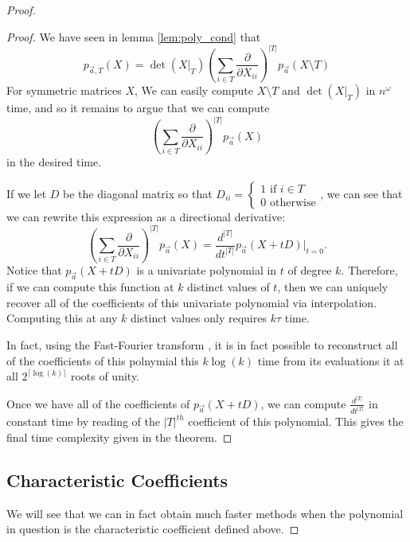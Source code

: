 \begin{proof}
\begin{proof}
    We have seen in lemma \ref{lem:poly_cond} that
    \[
        p_{\vec{a}, T}(X) = \det(X|_T) \left( \sum_{i \in T} \frac{\partial}{\partial X_{ii}} \right)^{|T|}p_{\vec{a}}(X \setminus T) 
    \]
    For symmetric matrices $X$, We can easily compute $X \setminus T$ and $\det(X|_T)$ in $n^{\omega}$ time, and so it remains to argue that we can compute 
    \[
         \left( \sum_{i \in T} \frac{\partial}{\partial X_{ii}} \right)^{|T|}p_{\vec{a}}(X)
    \]
    in the desired time.

    If we let $D$ be the diagonal matrix so that $D_{ii} = \begin{cases} 1 \text{ if }i \in T\\0 \text{ otherwise}\end{cases}$, we can see that we can rewrite this expression as a directional derivative:
    \[
        \left( \sum_{i \in T} \frac{\partial}{\partial X_{ii}} \right)^{|T|}p_{\vec{a}}(X) = \frac{d^{|T|}}{dt^{|T|}} p_{\vec{a}}(X + tD)|_{t = 0}. 
    \]
    Notice that $p_{\vec{a}}(X + tD)$ is a univariate polynomial in $t$ of degree $k$.
    Therefore, if we can compute this function at $k$ distinct values of $t$, then we can uniquely recover all of the coefficients of this univariate polynomial via interpolation.
    Computing this at any $k$ distinct values only requires $k\tau$ time.

    In fact, using the Fast-Fourier transform \cite{TODO}, it is in fact possible to reconstruct all of the coefficients of this polnymial this $k\log(k)$ time from its evaluations it at all $2^{\lceil \log(k) \rceil}$ roots of unity.

    Once we have all of the coefficients of $p_{\vec{a}}(X + tD)$, we can compute $\frac{d^{|T|}}{dt^{|T|}}$ in constant time by reading of the $|T|^{th}$ coefficient of this polynomial.
    This gives the final time complexity given in the theorem.
\end{proof}

\subsection{Characteristic Coefficients}
We will see that we can in fact obtain much faster methods when the polynomial in question is the characteristic coefficient defined above.


\end{proof}
